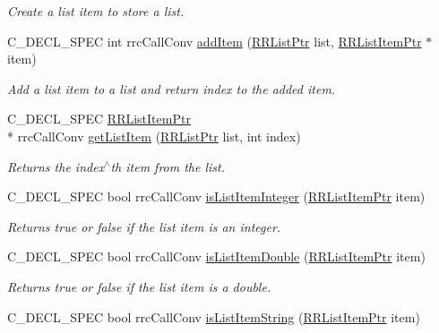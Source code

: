 \begin{DoxyCompactItemize}
\begin{DoxyCompactList}\small\item\em Create a list item to store a list. \end{DoxyCompactList}\item 
C\-\_\-\-D\-E\-C\-L\-\_\-\-S\-P\-E\-C int rrc\-Call\-Conv \hyperlink{group__list_ga2ae7d5112afc94d0dae42cc89b5158ee}{add\-Item} (\hyperlink{rrc__types_8h_a32a8a60ac06858ff3a791672bd2bec73}{R\-R\-List\-Ptr} list, \hyperlink{rrc__types_8h_a79938364b69256c42480bb3a29ebf73e}{R\-R\-List\-Item\-Ptr} $\ast$item)
\begin{DoxyCompactList}\small\item\em Add a list item to a list and return index to the added item. \end{DoxyCompactList}\item 
C\-\_\-\-D\-E\-C\-L\-\_\-\-S\-P\-E\-C \hyperlink{rrc__types_8h_a79938364b69256c42480bb3a29ebf73e}{R\-R\-List\-Item\-Ptr} \\*
rrc\-Call\-Conv \hyperlink{group__list_ga11a02911ab01db4dc839ae97782e5bf1}{get\-List\-Item} (\hyperlink{rrc__types_8h_a32a8a60ac06858ff3a791672bd2bec73}{R\-R\-List\-Ptr} list, int index)
\begin{DoxyCompactList}\small\item\em Returns the index$^\wedge$th item from the list. \end{DoxyCompactList}\item 
C\-\_\-\-D\-E\-C\-L\-\_\-\-S\-P\-E\-C bool rrc\-Call\-Conv \hyperlink{group__list_ga1606c8b04450d78d4801e652b034a42a}{is\-List\-Item\-Integer} (\hyperlink{rrc__types_8h_a79938364b69256c42480bb3a29ebf73e}{R\-R\-List\-Item\-Ptr} item)
\begin{DoxyCompactList}\small\item\em Returns true or false if the list item is an integer. \end{DoxyCompactList}\item 
C\-\_\-\-D\-E\-C\-L\-\_\-\-S\-P\-E\-C bool rrc\-Call\-Conv \hyperlink{group__list_ga1ffb77315b7ffd5e711c2a8171069caa}{is\-List\-Item\-Double} (\hyperlink{rrc__types_8h_a79938364b69256c42480bb3a29ebf73e}{R\-R\-List\-Item\-Ptr} item)
\begin{DoxyCompactList}\small\item\em Returns true or false if the list item is a double. \end{DoxyCompactList}\item 
C\-\_\-\-D\-E\-C\-L\-\_\-\-S\-P\-E\-C bool rrc\-Call\-Conv \hyperlink{group__list_ga2fc0e7b031bd6952cbce509e150d8191}{is\-List\-Item\-String} (\hyperlink{rrc__types_8h_a79938364b69256c42480bb3a29ebf73e}{R\-R\-List\-Item\-Ptr} item)

\end{DoxyCompactItemize}

